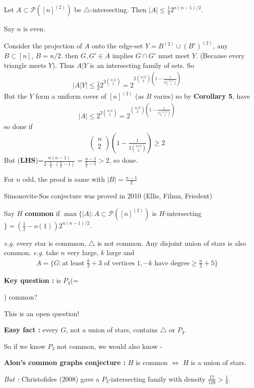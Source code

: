 \documentclass[12pt,a4paper]{report}
\newenvironment{proof}
{\begin{changemargin}{1cm}{0.5cm}
	}%
	{\end{changemargin}
}
\begin{document}
 Let $A\subset \mathscr{P}([n]^{(2)})$ be $\triangle$-intersecting. Then $|A| \leq \frac{1}{4}2^{n(n-1)/2}$.
\begin{proof}
\pf Say $n$ is even.

\quad Consider the projection of $A$ onto the edge-set $Y= B^{(2)} \cup (B^c)^{(2)}$, any $B\subset [n]$, $B= n/2$. then $G, G' \in A$ implies $G\cap G'$ must meet $Y$. (Because every triangle meets $Y$). Thus $A|Y$ is an intersecting family of sets. So
\begin{align*}
\big| A|Y \big| \leq \frac{1}{2} 2^{2 {n/2 \choose 2} } = 2^{2 {n/2 \choose 2} (1- \frac{1}{2 {n/2 \choose 2}}) }
\end{align*}
But the $Y$ form a uniform cover of $[n]^{(2)}$ (as $B$ varies) so by \textbf{Corollary 5}, have
\begin{align*}
|A| \leq 2^{2 {n/2 \choose 2} } = 2^{ {n/2 \choose 2} (1- \frac{1}{2 {n/2 \choose 2}}) }
\end{align*}
so done if
\begin{align*}
\begin{pmatrix}
n \\
2
\end{pmatrix} (1- \frac{1}{2 {n/2 \choose 2}}) \geq 2
\end{align*}
But (\textbf{LHS})=$\frac{n(n-1)}{2\cdot \frac{n}{2}\cdot (\frac{n}{2}-1)} = \frac{n-1}{\frac{n}{2}-1} >2$, so done.
\s

For $n$ odd, the proof is same with $|B| = \frac{n-1}{2}$

\eop
\end{proof}
\s

Simonovits-Sos conjecture was proved in 2010 (Ellis, Filmu, Friedent)
\s

Say $H$ \textbf{common} if $\max \{ |A| : A\subset \mathscr{P}([n]^{(2)})$ is $H$-intersecting$\}=(\frac{1}{2}- o(1))2^{n(n-1)/2}$.

\textit{e.g.} every star is commnon, $\triangle$ is not common. Any disjoint union of stars is also common, \textit{e.g.} take $n$ very large, $k$ large and
\begin{align*}
A = \{G : \text{at least } \frac{k}{2} +3 \text{ of vertices } 1, \cdots k \text{ have degree} \geq \frac{n}{2} + 5\}
\end{align*}
\s

\textbf{Key question :} is $P_3$(= ) common?

\quad This is an open question!
\s

\textbf{Easy fact :} every $G$, not a union of stars, contains $\triangle$ or $P_3$.
\s

So if we know $P_3$ not common, we would also know -
\s

\textbf{Alon's common graphs conjecture :} $H$ is common $\Leftrightarrow$ $H$ is a union of stars.
\s

\textit{But :} Christofides (2008) gave a $P_3$-intersecting family with density $\frac{17}{128} > \frac{1}{8}$.
\end{document}
